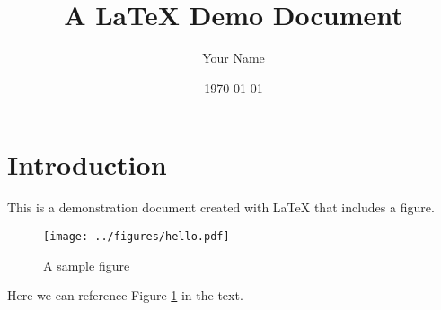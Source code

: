 \documentclass{article}
\title{A \LaTeX{} Demo Document}
\author{Your Name}
\date{\today}
\begin{document}
\maketitle

\section{Introduction}
This is a demonstration document created with \LaTeX{} that includes a figure.

\begin{figure}[h]
    \centering
    \texttt{[image: ../figures/hello.pdf]}
    \caption{A sample figure}
    \label{fig:hello}
\end{figure}

Here we can reference Figure \ref{fig:hello} in the text.
\end{document}
